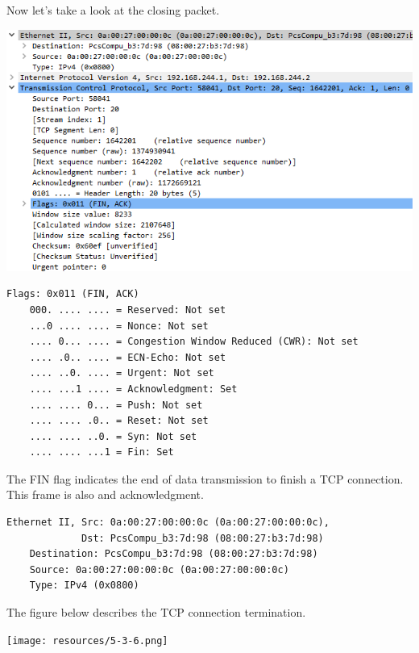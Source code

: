 \documentclass[12pt]{extarticle}
\begin{document}
Now let's take a look at the closing packet.
\begin{center}
\includegraphics[scale=0.6]{resources/5-3-5.png}
\end{center}
\begin{verbatim}
Flags: 0x011 (FIN, ACK)
    000. .... .... = Reserved: Not set
    ...0 .... .... = Nonce: Not set
    .... 0... .... = Congestion Window Reduced (CWR): Not set
    .... .0.. .... = ECN-Echo: Not set
    .... ..0. .... = Urgent: Not set
    .... ...1 .... = Acknowledgment: Set
    .... .... 0... = Push: Not set
    .... .... .0.. = Reset: Not set
    .... .... ..0. = Syn: Not set
    .... .... ...1 = Fin: Set
\end{verbatim}
The FIN flag indicates the end of data transmission to finish a TCP connection. This frame is also and acknowledgment.
\begin{verbatim}
Ethernet II, Src: 0a:00:27:00:00:0c (0a:00:27:00:00:0c),
             Dst: PcsCompu_b3:7d:98 (08:00:27:b3:7d:98)
    Destination: PcsCompu_b3:7d:98 (08:00:27:b3:7d:98)
    Source: 0a:00:27:00:00:0c (0a:00:27:00:00:0c)
    Type: IPv4 (0x0800)
\end{verbatim}
The figure below describes the TCP connection termination.
\begin{center}
\texttt{[image: resources/5-3-6.png]}
\end{center}
\end{document}
